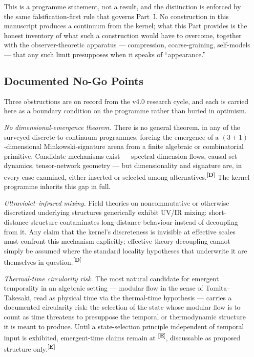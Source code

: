\documentclass[12pt,a4paper,twoside]{article}
\theoremstyle{plain}
\theoremstyle{definition}
\theoremstyle{remark}
\newcommand{\catmark}[1]{\textsuperscript{\textsf{\textbf{[#1]}}}}
\begin{document}
This is a programme statement, not a result, and the distinction is
enforced by the same falsification-first rule that governs Part~I. No
construction in this manuscript produces a continuum from the kernel; what
this Part provides is the honest inventory of what such a construction
would have to overcome, together with the observer-theoretic apparatus
--- compression, coarse-graining, self-models --- that any such limit
presupposes when it speaks of ``appearance.''

\subsection{Documented No-Go Points}
\label{subsec:no-go-points}

Three obstructions are on record from the v4.0 research cycle, and each
is carried here as a boundary condition on the programme rather than
buried in optimism.

\emph{No dimensional-emergence theorem.} There is no general theorem, in
any of the surveyed discrete-to-continuum programmes, forcing the
emergence of a $(3{+}1)$-dimensional Minkowski-signature arena from a
finite algebraic or combinatorial primitive. Candidate mechanisms exist
--- spectral-dimension flows, causal-set dynamics, tensor-network
geometry --- but dimensionality and signature are, in every case examined,
either inserted or selected among alternatives.\catmark{D} The kernel
programme inherits this gap in full.

\emph{Ultraviolet--infrared mixing.} Field theories on noncommutative or
otherwise discretized underlying structures generically exhibit
UV/IR mixing: short-distance structure contaminates long-distance
behaviour instead of decoupling from it. Any claim that the kernel's
discreteness is invisible at effective scales must confront this
mechanism explicitly; effective-theory decoupling cannot simply be
assumed where the standard locality hypotheses that underwrite it are
themselves in question.\catmark{D}

\emph{Thermal-time circularity risk.} The most natural candidate for
emergent temporality in an algebraic setting --- modular flow in the
sense of Tomita--Takesaki, read as physical time via the thermal-time
hypothesis --- carries a documented circularity risk: the selection of
the state whose modular flow is to count as time threatens to presuppose
the temporal or thermodynamic structure it is meant to produce. Until a
state-selection principle independent of temporal input is exhibited,
emergent-time claims remain at \catmark{E}, discussable as proposed
structure only.\catmark{E}
\end{document}

